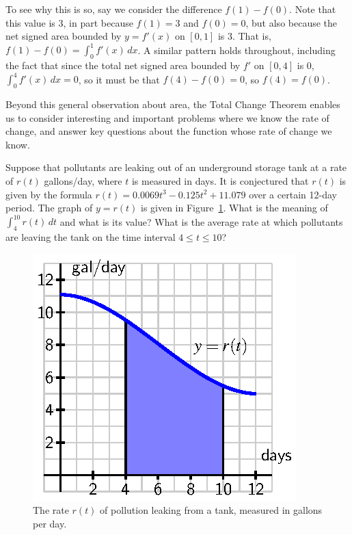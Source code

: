 To see why this is so, say we consider the difference $f(1) - f(0)$.  Note that this value is 3, in part because $f(1) = 3$ and $f(0) = 0$, but also because the net signed area bounded by $y = f'(x)$ on $[0,1]$ is 3.  That is, $f(1) - f(0) = \int_0^1 f'(x) \, dx$.  A similar pattern holds throughout, including the fact that since the total net signed area bounded by $f'$ on $[0,4]$ is $0$, $\int_0^4 f'(x) \, dx = 0$, so it must be that $f(4) - f(0) = 0$, so $f(4) = f(0)$.

Beyond this general observation about area, the Total Change Theorem enables us to consider interesting and important problems where we know the rate of change, and answer key questions about the function whose rate of change we know. 

\begin{example} \label{Ex:4.4.1}
Suppose that pollutants are leaking out of an underground storage tank at a rate of $r(t)$ gallons/day, where $t$ is measured in days.  It is conjectured that $r(t)$ is given by the formula $r(t) = 0.0069t^3 -0.125t^2+11.079$ over a certain 12-day period.  The graph of $y=r(t)$ is given in Figure~\ref{F:4.4.TCTEx}.  What is the meaning of $\int_4^{10} r(t) \, dt$ and what is its value?  What is the average rate at which pollutants are leaving the tank on the time interval $4 \le t \le 10$?
\begin{figure}[h]
\begin{center}
\includegraphics{figures/4_4_TCTEx.eps}
\caption{The rate $r(t)$ of pollution leaking from a tank, measured in gallons per day.} \label{F:4.4.TCTEx}
\end{center}
\end{figure}
\end{example}
